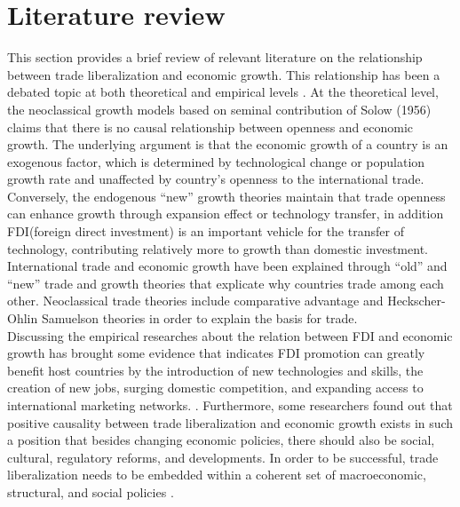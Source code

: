 \documentclass[12pt,a4 paper,title page]{article}
\begin{document}
\section{Literature review}
This section provides a brief review of relevant literature on the relationship between trade liberalization and economic growth. This relationship has been a debated topic at both theoretical and empirical levels \citep{khalifa2002financial}.
At the theoretical level, the neoclassical growth models based on seminal contribution of Solow (1956) claims that there is no causal relationship between openness and economic growth.
The underlying argument is that the economic growth of a country is an exogenous factor, which is determined by technological change or population growth rate and unaffected by country’s openness to the international trade.\citet{khalifa2002financial}
Conversely, the endogenous “new” growth theories maintain that trade openness can enhance growth through expansion effect or technology transfer\citep{khalifa2002financial}, in addition FDI(foreign direct investment) is an important vehicle for the transfer of technology, contributing relatively more to growth than domestic investment.\citep{borensztein1998does} \\
International trade and economic growth have been explained through “old” and “new” trade and growth theories that explicate why countries trade among each other. Neoclassical trade theories include comparative advantage and Heckscher-Ohlin Samuelson theories in order to explain the basis for trade.\citep{pigka2013impact} \\
Discussing the empirical researches about the relation between FDI and economic growth has brought some evidence that indicates FDI promotion can greatly benefit host countries by the introduction of new technologies and skills, the creation of new jobs, surging domestic competition, and expanding access to international marketing networks. \citep{belloumi2014relationship}.
Furthermore, some researchers found out that positive causality between trade liberalization and economic growth exists in such a position that besides changing economic policies, there should also be social, cultural, regulatory reforms, and developments.
In order to be successful, trade liberalization needs to be embedded within a coherent set of macroeconomic, structural, and social policies \citep{lee2005trade}.
\end{document}
